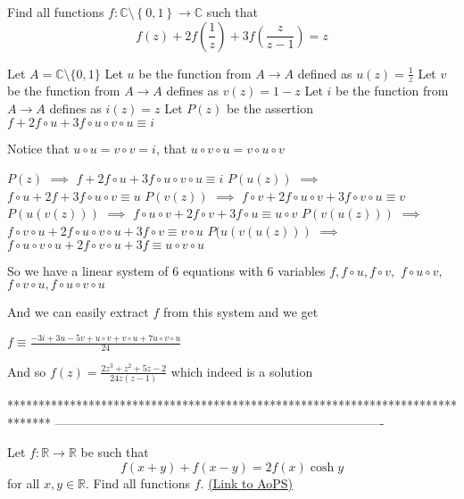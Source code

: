 \begin{solution}
	\begin{tcolorbox}Find all functions $ f:\mathbb{C}\setminus \left \{ 0,1 \right \}\rightarrow \mathbb{C} $ such that\[f(z)+2f(\frac{1}{z})+3f(\frac{z}{z-1})=z\]\end{tcolorbox}
Let $A=\mathbb C\setminus\{0,1\}$
Let $u$ be the function from $A\to A$ defined as $u(z)=\frac 1z$
Let $v$ be the function from $A\to A$ defines as $v(z)=1-z$
Let $i$ be the function from $A\to A$ defines as $i(z)=z$
Let $P(z)$ be the assertion $f+2f\circ u+3f\circ u\circ v\circ u\equiv i$

Notice that $u\circ u=v\circ v=i$, that $u\circ v\circ u=v\circ u\circ v$

$P(z)$ $\implies$ $f+2f\circ u+3f\circ u\circ v\circ u\equiv i$
$P(u(z))$ $\implies$ $f\circ u+2f+3f\circ u\circ v\equiv u$
$P(v(z))$ $\implies$ $f\circ v+2f\circ u\circ v+3f\circ v\circ u\equiv v$
$P(u(v(z)))$ $\implies$ $f\circ u\circ v+2f\circ v+3f\circ u\equiv u\circ v$
$P(v(u(z)))$ $\implies$ $f\circ v\circ u+2f\circ u\circ v\circ u+3f\circ v\equiv  v\circ u$
$P(u(v(u(z)))$ $\implies$ $f\circ u\circ v\circ u+2f\circ v\circ u+3f\equiv u\circ v\circ u$

So we have a linear system of 6 equations with 6 variables $f,f\circ u,f\circ v,$ $f\circ u\circ v,$ $f\circ v\circ u,f\circ u\circ v\circ u$

And we can easily extract $f$ from this system and we get 

$f\equiv \frac{-3i+3u-5v+u\circ v+v\circ u+7u\circ v\circ u}{24}$

And so $\boxed{f(z)=\frac{2z^3+z^2+5z-2}{24z(z-1)}}$ which indeed is a solution
\end{solution}
*******************************************************************************
-------------------------------------------------------------------------------

\begin{problem}
	Let $ f:\mathbb{R}\rightarrow \mathbb{R} $ be such that \[f(x+y)+f(x-y)=2f(x)\cosh y\]
for all $ x,y\in \mathbb{R} $.
Find all functions $ f $.
	\flushright \href{https://artofproblemsolving.com/community/c6h467179}{(Link to AoPS)}
\end{problem}



